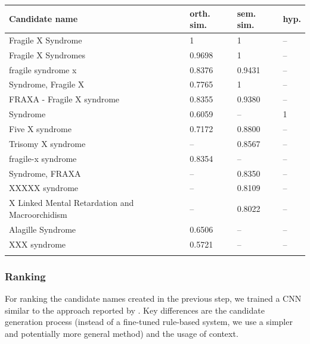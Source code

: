 \documentclass{bioinfo}
\begin{document}
\begin{table}[!t]
{\begin{tabular}{@{}llll@{}}\toprule
  Candidate name & orth. sim. & sem. sim. & hyp.\\\midrule
  Fragile X Syndrome                             & 1      & 1      & --\\
  Fragile X Syndromes                            & 0.9698 & 1      & --\\
  fragile syndrome x                             & 0.8376 & 0.9431 & --\\
  Syndrome, Fragile X                            & 0.7765 & 1      & --\\
  FRAXA - Fragile X syndrome                     & 0.8355 & 0.9380 & --\\
  Syndrome                                       & 0.6059 & --     & 1 \\
  Five X syndrome                                & 0.7172 & 0.8800 & --\\
  Trisomy X syndrome                             & --     & 0.8567 & --\\
  fragile-x syndrome                             & 0.8354 & --     & --\\
  Syndrome, FRAXA                                & --     & 0.8350 & --\\
  XXXXX syndrome                                 & --     & 0.8109 & --\\
  X Linked Mental Retardation and Macroorchidism & --     & 0.8022 & --\\
  Alagille Syndrome                              & 0.6506 & --     & --\\
  XXX syndrome                                   & 0.5721 & --     & --\\
  \botrule
\end{tabular}}{}
\end{table}

\subsubsection{Ranking}
\label{ssub:ranking}

For ranking the candidate names created in the previous step, we trained a CNN similar to the approach reported by \cite{lihaodi-et-al:2017}.
Key differences are the candidate generation process (instead of a fine-tuned rule-based system, we use a simpler and potentially more general method) and the usage of context.
\end{document}
